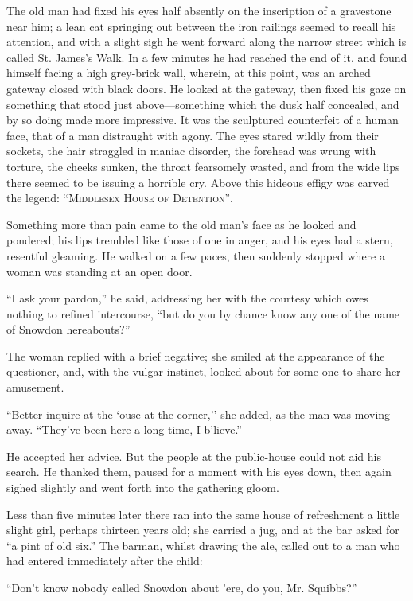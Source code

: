 The old man had fixed his eyes half absently on the inscription of a
gravestone near him; a lean cat springing out between the iron railings
seemed to recall his attention, and with a slight sigh he went forward
along the narrow street which is called St. James's Walk. In a few
minutes he had reached the end of it, and found himself facing a high
grey-brick wall, wherein, at this point, was an arched gateway closed
with black doors. He looked at the gateway, then fixed his gaze on
something that stood just above---something which the dusk half
concealed, and by so doing made more impressive. It was the sculptured
counterfeit of a human face, that of a man distraught with agony. The
eyes stared wildly from their sockets, the hair straggled in maniac
disorder, the forehead was wrung with torture, the cheeks sunken, the
throat fearsomely wasted, and from the wide lips there seemed to be
issuing a {}horrible cry. Above this hideous effigy was carved the
legend: \textsc{``Middlesex House of Detention''}.

Something more than pain came to the old man's face as he looked and
pondered; his lips trembled like those of one in anger, and his eyes had
a stern, resentful gleaming. He walked on a few paces, then suddenly
stopped where a woman was standing at an open door.

``I ask your pardon,'' he said, addressing her with the courtesy which
owes nothing to refined intercourse, ``but do you by chance know any one
of the name of Snowdon hereabouts?''

The woman replied with a brief negative; she smiled at the appearance of
the questioner, and, with the vulgar instinct, looked about for some one
to share her amusement.

``Better inquire at the `ouse at the corner,'' she added, as the man was
moving away. ``They've been here a long time, I b'lieve.''

He accepted her advice. But the people {}at the public-house could not
aid his search. He thanked them, paused for a moment with his eyes down,
then again sighed slightly and went forth into the gathering gloom.

Less than five minutes later there ran into the same house of
refreshment a little slight girl, perhaps thirteen years old; she
carried a jug, and at the bar asked for ``a pint of old six.'' The
barman, whilst drawing the ale, called out to a man who had entered
immediately after the child:

``Don't know nobody called Snowdon about 'ere, do you, Mr. Squibbs?''

